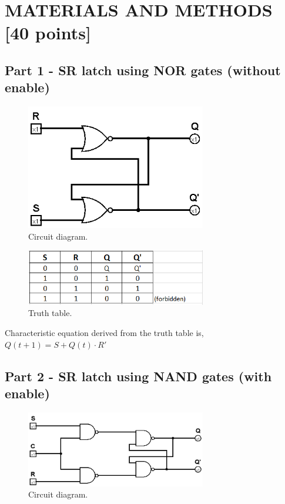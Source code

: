 \documentclass[pdftex,12pt,a4paper]{article}
\begin{document}
\section{MATERIALS AND METHODS [40 points]}

\subsection{Part 1 - SR latch using NOR gates (without enable)}
\begin{figure}[H]
	\centering
	\includegraphics[width=0.7\textwidth]{circ1.png}	
	\caption{Circuit diagram.}
	\label{fig1}
\end{figure}

\begin{figure}[H]
	\centering
	\includegraphics[width=0.7\textwidth]{truthtable1.PNG}	
	\caption{Truth table.}
	\label{fig1}
\end{figure}
Characteristic equation derived from the truth table is, \(Q(t+1) = S + Q(t) \cdot R'\)

\subsection{Part 2 - SR latch using NAND gates (with enable)}
\begin{figure}[H]
	\centering
	\includegraphics[width=0.7\textwidth]{circ2.PNG}	
	\caption{Circuit diagram.}
	\label{fig1}
\end{figure}
\end{document}
